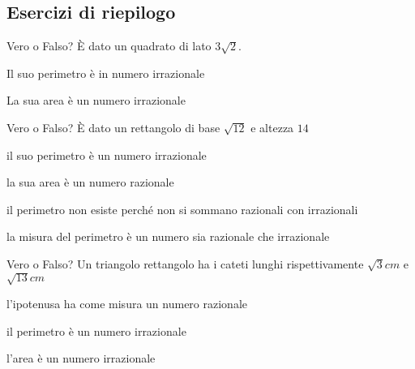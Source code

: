 \subsection*{Esercizi di riepilogo}

\begin{esercizio}
 \label{ese:2.90}
Vero o Falso? È dato un quadrato di lato \(3\sqrt 2\).

\TabPositions{11.5cm}
 \begin{enumeratea}
 \item Il suo perimetro è in numero irrazionale \tab\boxV\quad\boxF
 \item La sua area è un numero irrazionale\tab\boxV\quad\boxF
 \end{enumeratea}
\end{esercizio}

\begin{esercizio}
 \label{ese:2.91}
Vero o Falso? È dato un rettangolo di base \(\sqrt{12}\) e altezza \(14\)

\TabPositions{11.5cm}
 \begin{enumeratea}
 \item il suo perimetro è un numero irrazionale \tab\boxV\quad\boxF
 \item la sua area è un numero razionale \tab\boxV\quad\boxF
 \item il perimetro non esiste perché non si sommano razionali con 
  irrazionali \tab\boxV\quad\boxF
 \item la misura del perimetro è un numero sia razionale che 
  irrazionale \tab\boxV\quad\boxF
 \end{enumeratea}
\end{esercizio}

\begin{esercizio}%
Vero o Falso? Un triangolo rettangolo ha i cateti lunghi 
rispettivamente \(\sqrt 3\unit{cm}\) e \(\sqrt{13}\unit{cm}\)

\TabPositions{11.5cm}
 \begin{enumeratea}
 \item l'ipotenusa ha come misura un numero razionale \tab\boxV\quad\boxF
 \item il perimetro è un numero irrazionale \tab\boxV\quad\boxF
 \item l'area è un numero irrazionale \tab\boxV\quad\boxF
 \end{enumeratea}
\end{esercizio}

\newpage %

